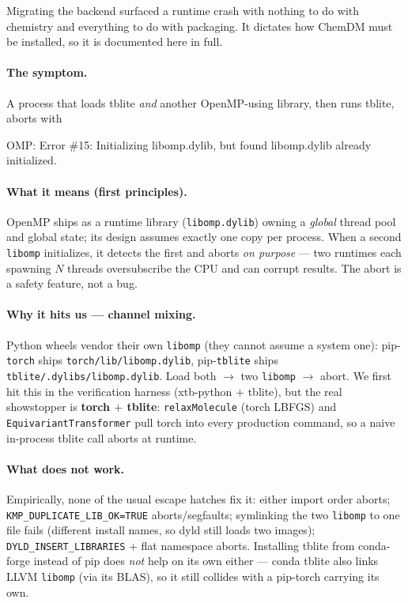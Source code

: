\documentclass[11pt]{article}
\newcommand{\code}[1]{\texttt{#1}}
\begin{document}
Migrating the backend surfaced a runtime crash with nothing to do with chemistry
and everything to do with packaging. It dictates how ChemDM must be installed, so
it is documented here in full.

\paragraph{The symptom.} A process that loads tblite \emph{and} another
OpenMP-using library, then runs tblite, aborts with
\begin{center}\small\ttfamily OMP: Error \#15: Initializing libomp.dylib, but found libomp.dylib already initialized.\end{center}

\paragraph{What it means (first principles).} OpenMP ships as a runtime library
(\code{libomp.dylib}) owning a \emph{global} thread pool and global state; its
design assumes exactly one copy per process. When a second \code{libomp}
initializes, it detects the first and aborts \emph{on purpose} --- two runtimes
each spawning $N$ threads oversubscribe the CPU and can corrupt results. The abort
is a safety feature, not a bug.

\paragraph{Why it hits us --- channel mixing.} Python wheels vendor their own
\code{libomp} (they cannot assume a system one): pip-\code{torch} ships
\code{torch/lib/libomp.dylib}, pip-\code{tblite} ships
\code{tblite/.dylibs/libomp.dylib}. Load both $\to$ two \code{libomp} $\to$ abort.
We first hit this in the verification harness (xtb-python $+$ tblite), but the real
showstopper is \textbf{torch $+$ tblite}: \code{relaxMolecule} (torch LBFGS) and
\code{EquivariantTransformer} pull torch into every production command, so a naive
in-process tblite call aborts at runtime.

\paragraph{What does not work.} Empirically, none of the usual escape hatches fix
it: either import order aborts; \code{KMP\_DUPLICATE\_LIB\_OK=TRUE}
aborts/segfaults; symlinking the two \code{libomp} to one file fails (different
install names, so dyld still loads two images); \code{DYLD\_INSERT\_LIBRARIES} $+$
flat namespace aborts. Installing tblite from conda-forge instead of pip does
\emph{not} help on its own either --- conda tblite also links LLVM \code{libomp}
(via its BLAS), so it still collides with a pip-torch carrying its own.
\end{document}
